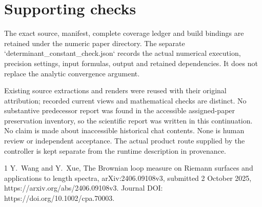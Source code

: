 \documentclass[10pt]{article}
\begin{document}
\section*{Supporting checks}
The exact source, manifest, complete coverage ledger and build bindings are retained under the numeric paper directory. The separate `determinant\_constant\_check.json` records the actual numerical execution, precision settings, input formulas, output and retained dependencies. It does not replace the analytic convergence argument.\par
Existing source extractions and renders were reused with their original attribution; recorded current views and mathematical checks are distinct. No substantive predecessor report was found in the accessible assigned-paper preservation inventory, so the scientific report was written in this continuation. No claim is made about inaccessible historical chat contents. None is human review or independent acceptance. The actual product route supplied by the controller is kept separate from the runtime description in provenance.\par
1 Y. Wang and Y. Xue, The Brownian loop measure on Riemann surfaces and applications to length spectra, arXiv:2406.09108v3, submitted 2 October 2025, https://arxiv.org/abs/2406.09108v3. Journal DOI: https://doi.org/10.1002/cpa.70003.\par
\end{document}

